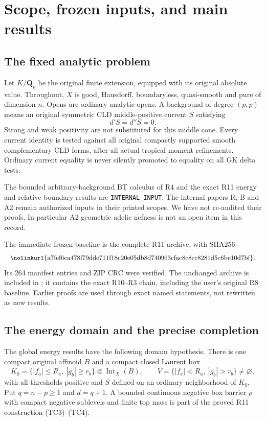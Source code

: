 \documentclass[11pt,a4paper]{article}
\numberwithin{equation}{section}
\theoremstyle{definition}
\theoremstyle{remark}
\begin{document}
\section{Scope, frozen inputs, and main results}
\label{sec:r12-scope}

\subsection{The fixed analytic problem}

Let $K/\mathbf Q_p$ be the original finite extension, equipped with its
original absolute value. Throughout, $X$ is good, Hausdorff, boundaryless,
quasi-smooth and pure of dimension $n$. Opens are ordinary analytic
opens. A background of degree $(p,p)$ means an original symmetric
CLD middle-positive current $S$ satisfying
\[
                         d'S=d''S=0.
 \tag{M1}
\]
Strong and weak positivity are not substituted for this middle cone.
Every current identity is tested against all original compactly
supported smooth complementary CLD forms, after all actual tropical
moment refinements. Ordinary current equality is never silently
promoted to equality on all GK delta tests.

The bounded arbitrary-background BT calculus of R4 and the exact
R11 energy and relative boundary results are
\texttt{INTERNAL\_INPUT}. The internal papers R, B and A2 remain
authorized inputs in their printed scopes. We have not re-audited
their proofs. In particular A2 geometric adelic nefness is not an
open item in this record.

The immediate frozen baseline is the complete R11 archive, with SHA256
\[
 \text{\small\nolinkurl{a7fef6ca478f79dde711f18c20e05db8d740963cfac8c8cc8281d5c6be10d7bf}}.
\]
Its 264 manifest entries and ZIP CRC were verified. The unchanged
archive is included in ; it contains the exact
R10--R3 chain, including the user's original R8 baseline. Earlier
proofs are used through exact named statements, not rewritten as
new results.

\subsection{The energy domain and the precise completion}

The global energy results have the following domain hypothesis.
There is one compact original affinoid $B$ and a compact closed
Laurent box
\[
 K_0=\{|f_a|\leq R_a,\ |g_b|\geq r_b\}
                      \Subset\operatorname{Int}_X(B),
 \qquad
 V=\{|f_a|<R_a,\ |g_b|>r_b\}\ne\varnothing,
 \tag{M2}
\]
with all thresholds positive and $S$ defined on an ordinary
neighborhood of $K_0$. Put $q=n-p\geq1$ and $d=q+1$.
A bounded continuous negative box barrier $\rho$ with compact
negative sublevels and finite top mass is part of the proved
R11 construction (TC3)--(TC4).
\end{document}
